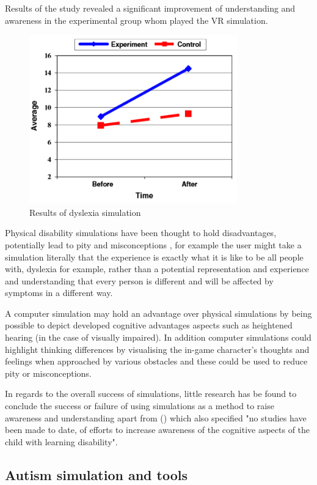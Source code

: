 \documentclass[11pt]{report}
\begin{document}
Results of the study revealed a significant improvement of understanding and awareness in the experimental group whom played the VR simulation.

\begin{figure}[H]
\centering
\includegraphics[width=90mm]{images/litreview/dsimresults.png}
\caption{Results of dyslexia simulation}
\label{autisim1}
\end{figure}

Physical disability simulations have been thought to hold disadvantages, potentially lead to pity and misconceptions \cite{dd}, for example the user might take a simulation literally that the experience is exactly what it is like to be all people with, dyslexia for example, rather than a potential representation and experience and understanding that every person is different and will be affected by symptoms in a different way.

A computer simulation may hold an advantage over physical simulations by being possible to depict developed cognitive advantages aspects such as heightened hearing (in the case of visually impaired). In addition computer simulations could highlight thinking differences by visualising the in-game character's thoughts and feelings when approached by various obstacles and these could be used to reduce pity or misconceptions.

In regards to the overall success of simulations, little research has be found to conclude the success or failure of using simulations as a method to raise awareness and understanding apart from (\cite{dyslexicsimpar}) which also specified "no studies have been made to date, of efforts to increase awareness of the cognitive aspects of the child with learning disability".

\subsection{Autism simulation and tools}
\end{document}
